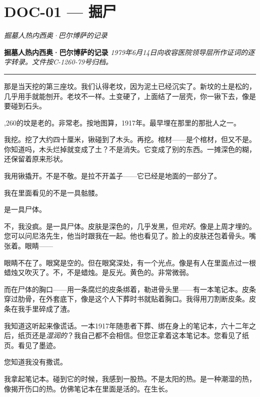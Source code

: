 \section*{\textbf{DOC-01} --- 掘尸}

\noindent \textit{掘墓人热内西奥·巴尔博萨的记录}

\noindent \textbf{掘墓人热内西奥·巴尔博萨的记录}
\textit{1979年6月14日向收容医院领导层所作证词的逐字转录。文件按C-1260-79号归档。}

\vspace{0.5em}\noindent\rule{\textwidth}{0.5pt}\vspace{0.5em}

\noindent 那是当天挖的第三座坟。我们认得老坟，因为泥土已经沉实了。新坟的土是松的，几乎用手就能刨开。老坟不一样。土变硬了，上面结了一层壳，你一锹下去，像是要碰到石头。

,260的坟是老的。非常老。按地图算，1917年。最早埋在那里的那批人之一。

\noindent 我挖。挖了大约四十厘米，锹碰到了木头。再挖。棺材——是个棺材，但又不是。你知道吗，木头烂掉就变成了土？不是消失。它变成了别的东西。一摊深色的糊，还保留着原来形状。

\noindent 我用锹撬开。不是不敬。是拉不开盖子——它已经是地面的一部分了。

\noindent 我在里面看见的不是一具骷髅。

\noindent 是一具尸体。

\noindent 不，我没疯。是一具尸体。皮肤是深色的，几乎发黑，但\textit{完好}。像是上周才埋的。您可以问尼洛先生，他当时跟我在一起。他也看见了。脸上的皮肤还包着骨头。嘴张着。眼睛——

\noindent 眼睛不在了。眼窝是空的。但在眼窝深处，有一个光点。像是有人在里面点过一根蜡烛又吹灭了。不，不是蜡烛。是反光。黄色的。非常微弱。

\noindent 而在尸体的胸口——用一条腐烂的皮条绑着，勒进骨头里——有一本笔记本。皮条穿过肋骨，在外套底下，像是这个人下葬时书就贴着胸口。我得用刀割断皮条。皮条在我手里碎成了渣。

\noindent 我知道这听起来像谎话。一本1917年随患者下葬、绑在身上的笔记本，六十二年之后，纸页还是\textit{湿润的}？我自己都不会相信。但您正拿着这本笔记本。您看见了纸页。看见了墨迹。

\noindent 您知道我没有撒谎。

\noindent 我拿起笔记本。碰到它的时候，我感到一股热。不是太阳的热。是一种潮湿的热，像揭开伤口的热。仿佛笔记本在里面是活的。在生长。


